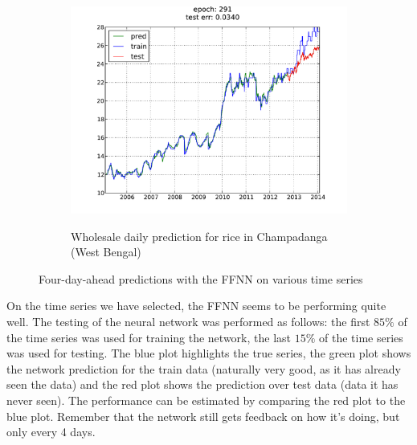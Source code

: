 \begin{figure}[H]
\begin{subfigure}[b]{.45\linewidth}
        \includegraphics[width=\textwidth]{img/ffnn/7.pdf}
        \label{subfig:ffnn_pred_7}
        \caption{Wholesale daily prediction for rice in Champadanga (West Bengal)}
        \end{subfigure}
    \caption{Four-day-ahead predictions with the FFNN on various time series}
    \label{fig:ffnn_pred}
\end{figure}

On the time series we have selected, the FFNN seems to be performing quite
well. The testing of the neural network was performed as follows: the first
$85\%$ of the time series was used for training the network, the last $15\%$ of
the time series was used for testing. The blue plot highlights the true series,
the green plot shows the network prediction for the train data (naturally very
good, as it has already seen the data) and the red plot shows the prediction
over test data (data it has never seen). The performance can be estimated by
comparing the red plot to the blue plot. Remember that the network still gets
feedback on how it's doing, but only every 4 days.


